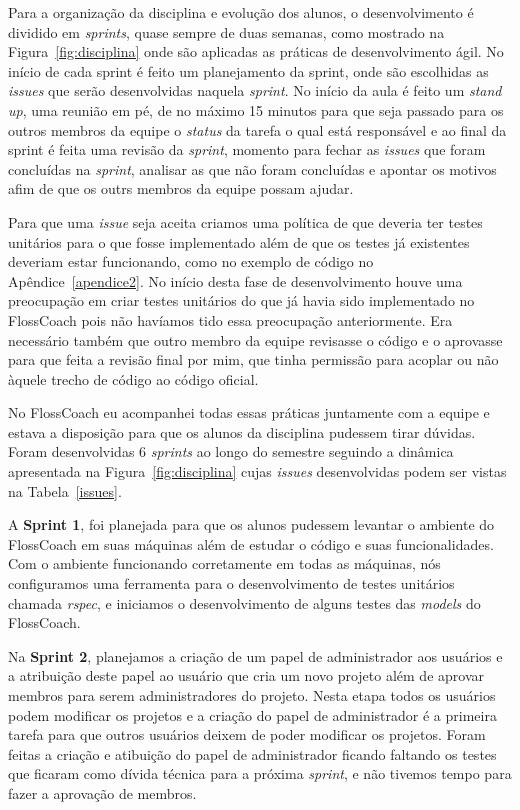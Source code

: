 Para a organização da disciplina e evolução dos alunos, o desenvolvimento é dividido
em \textit{sprints}, quase sempre de duas semanas, como mostrado na Figura~\ref{fig:disciplina}
onde são aplicadas as práticas de desenvolvimento ágil. No início de cada sprint é feito um planejamento da sprint, 
onde são escolhidas as \textit{issues} que serão desenvolvidas naquela \textit{sprint}.
No início da aula é feito um \textit{stand up}, uma reunião em pé, de no máximo 15
minutos para que seja passado para os outros membros da equipe o \textit{status} da
tarefa o qual está responsável e ao final da sprint é feita uma revisão da \textit{sprint},
momento para fechar as \textit{issues} que foram concluídas na \textit{sprint}, 
analisar as que não foram concluídas e apontar os motivos afim de que os outrs membros
da equipe possam ajudar.

Para que uma \textit{issue} seja aceita criamos uma política de que deveria ter
testes unitários para o que fosse implementado além de que os testes já existentes
deveriam estar funcionando, como no exemplo de código no Apêndice~\ref{apendice2}.
No início desta fase de desenvolvimento houve uma preocupação 
em criar testes unitários do que já havia sido implementado no FlossCoach pois 
não havíamos tido essa preocupação anteriormente. Era necessário também que outro 
membro da equipe revisasse o código e o aprovasse para que feita a revisão final
por mim, que tinha permissão para acoplar ou não àquele trecho de código ao
código oficial. 

No FlossCoach eu acompanhei todas essas práticas juntamente com a equipe e estava
a disposição para que os alunos da disciplina pudessem tirar dúvidas. Foram desenvolvidas
6 \textit{sprints} ao longo do semestre seguindo a dinâmica apresentada na Figura~\ref{fig:disciplina} 
cujas \textit{issues} desenvolvidas podem ser vistas na Tabela~\ref{issues}.

A \textbf{Sprint 1}, foi planejada para que os alunos pudessem levantar o ambiente
do FlossCoach em suas máquinas além de estudar o código e suas funcionalidades. Com o
ambiente funcionando corretamente em todas as máquinas, nós configuramos uma ferramenta
para o desenvolvimento de testes unitários chamada \textit{rspec}, e iniciamos o 
desenvolvimento de alguns testes das \textit{models} do FlossCoach. 

Na \textbf{Sprint 2}, planejamos a criação de um papel de administrador aos usuários
e a atribuição deste papel ao usuário que cria um novo projeto além de aprovar 
membros para serem administradores do projeto. Nesta etapa todos os usuários podem
modificar os projetos e a criação do papel de administrador é a primeira tarefa 
para que outros usuários deixem de poder modificar os projetos. Foram feitas a 
criação e atibuição do papel de administrador ficando faltando os testes que
ficaram como dívida técnica para a próxima \textit{sprint}, e não tivemos tempo para fazer a 
aprovação de membros. 

